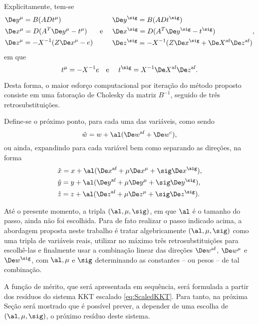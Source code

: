 Explicitamente, tem-se 
\begin{equation}
\label{eq:De_C} 
\begin{aligned}
& \Dey^{\mu} = B(ADt^\mu )\\
& \Dex^{\mu} = D(A^T\Dey^{\mu} - t^\mu) \\
& \Dez^{\mu} = -X^{-1}(Z\Dex^{\mu} - e)
\end{aligned} \text{\quad e \quad } \begin{aligned}
& \Dey^{\sig} = B(ADt^\sig)\\
& \Dex^{\sig} = D(A^T\Dey^{\sig} - t^\sig) \\
& \Dez^{\sig} = -X^{-1}(Z\Dex^{\sig} + \deX\dez)
\end{aligned}, 
\end{equation}
em que
\[
t^\mu = - X^{-1}e \text{\quad e \quad} t^\sig = X^{-1}\deX\dez.
\]

Desta forma, o maior esforço computacional por iteração do método proposto consiste
em uma fatoração de Cholesky da matriz $B^{-1}$, seguido de três retrosubstituições.
 
 
Define-se o próximo ponto, para cada uma das variáveis, como sendo \[\hat{w} = w
+ \al(\dew + \Decow),\] 
ou ainda, expandindo para cada variável bem como
separando as direções, na forma
\begin{subequations}
\label{eq:next-iterate}
\begin{align}
& \hat{x} = x + \al(\dex + \mu\Dex^\mu + \sig\Dex^\sig ),  \\
& \hat{y} = y + \al(\dey + \mu\Dey^\mu + \sig\Dey^\sig ), \\
& \hat{z} = z + \al(\dez + \mu\Dez^\mu + \sig\Dez^\sig ).
\end{align} 
\end{subequations}

Até o presente momento, a tripla $(\al, \mu,\sig)$, em que $\al$ é o tamanho do
passo, ainda não foi escolhida. Para de fato realizar o passo indicado acima, a
abordagem proposta neste trabalho é tratar algebricamente $(\al, \mu,\sig)$ como
uma tripla de variáveis reais, utilizar no máximo três retrosubstituições para
escolhê-las e finalmente usar a combinação linear das direções $\dew$,
$\Dew^\mu$ e $\Dew^\sig$, com $\al,\mu$ e $\sig$ determinando
as constantes -- ou pesos --  de tal combinação.




A função de mérito, que será  apresentada em sequência, será formulada a partir
dos resíduos do sistema KKT escalado \eqref{eq:ScaledKKT}. Para tanto, na
próxima Seção será mostrado que é possível prever, a depender de
uma escolha de $(\al, \mu,\sig)$, o próximo resíduo deste sistema.


